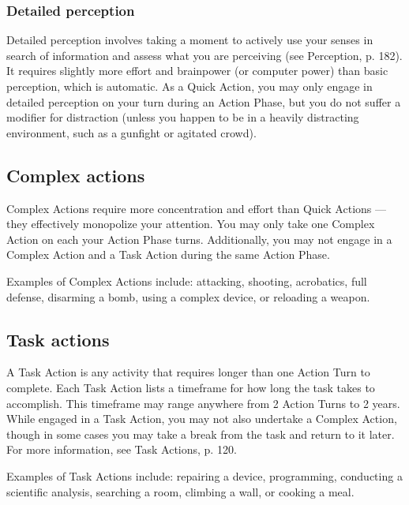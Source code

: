 \subsubsection{Detailed perception} 

Detailed perception involves taking a moment to actively use your senses in search of information and assess what you are perceiving (see Perception, p. 182). It requires slightly more effort and brainpower (or computer power) than basic perception, which is automatic. As a Quick Action, you may only engage in detailed perception on your turn during an Action Phase, but you do not suffer a modifier for distraction (unless you happen to be in a heavily distracting environment, such as a gunfight or agitated crowd). 



\subsection{Complex actions} \label{sec:combat-complex-actions} 

Complex Actions require more concentration and effort than Quick Actions --- they effectively monopolize your attention. You may only take one Complex Action on each your Action Phase turns. Additionally, you may not engage in a Complex Action and a Task Action during the same Action Phase. 

Examples of Complex Actions include: attacking, shooting, acrobatics, full defense, disarming a bomb, using a complex device, or reloading a weapon. 



\subsection{Task actions} \label{sec:combat-task-actions} 

A Task Action is any activity that requires longer than one Action Turn to complete. Each Task Action lists a timeframe for how long the task takes to accomplish. This timeframe may range anywhere from 2 Action Turns to 2 years. While engaged in a Task Action, you may not also undertake a Complex Action, though in some cases you may take a break from the task and return to it later. For more information, see Task Actions, p. 120. 

Examples of Task Actions include: repairing a device, programming, conducting a scientific analysis, searching a room, climbing a wall, or cooking a meal. 



